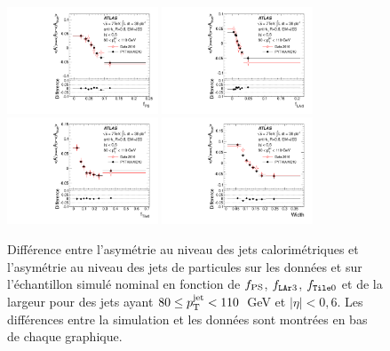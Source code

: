 \begin{figure}[!htb]
\centering
\includegraphics[width=0.4\textwidth]{figures/fig_49a.pdf}
\hspace{1.cm}
\includegraphics[width=0.4\textwidth]{figures/fig_49b.pdf}\\
\includegraphics[width=0.4\textwidth]{figures/fig_49c.pdf}
\hspace{1.cm}
\includegraphics[width=0.4\textwidth]{figures/fig_49d.pdf}
\caption{Diff\'erence entre l'asym\'etrie au niveau des jets calorim\'etriques et l'asym\'etrie au niveau des jets de particules sur les donn\'ees et sur l'\'echantillon simul\'e nominal en fonction de  $f_{\rm PS}$, $f_{\texttt{LAr} 3}$, $f_{\texttt{Tile} 0}$ et de la largeur pour des jets ayant  $80 \le p_{\mathrm{T}}^\mathrm{jet} < 110$~GeV et $|\eta| < 0,6$. Les diff\'erences entre la simulation et les donn\'ees sont montr\'ees en bas de chaque graphique.}
\label{fig:DijetMethodDATA}
\end{figure}

